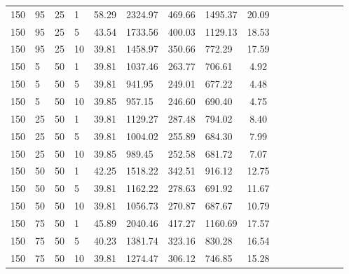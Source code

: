 \begin{center}
\begin{table}[h]
\begin{tabular}{clclclclclclclc|c}
150 & 95 & 25 & 1 & \cellcolor{gray!1}58.29 & \cellcolor{gray!1}2324.97 & \cellcolor{gray!1}469.66 & \cellcolor{gray!1}1495.37 & 20.09\\
150 & 95 & 25 & 5 & \cellcolor{gray!13}43.54 & \cellcolor{gray!1}1733.56 & \cellcolor{gray!1}400.03 & \cellcolor{gray!1}1129.13 & 18.53\\
150 & 95 & 25 & 10 & \cellcolor{gray!50}39.81 & \cellcolor{gray!1}1458.97 & \cellcolor{gray!1}350.66 & \cellcolor{gray!21}772.29 & 17.59\\
150 & 5 & 50 & 1 & \cellcolor{gray!50}39.81 & \cellcolor{gray!30}1037.46 & \cellcolor{gray!19}263.77 & \cellcolor{gray!41}706.61 & 4.92\\
150 & 5 & 50 & 5 & \cellcolor{gray!50}39.81 & \cellcolor{gray!48}941.95 & \cellcolor{gray!36}249.01 & \cellcolor{gray!50}677.22 & 4.48\\
150 & 5 & 50 & 10 & \cellcolor{gray!50}39.85 & \cellcolor{gray!45}957.15 & \cellcolor{gray!39}246.60 & \cellcolor{gray!46}690.40 & 4.75\\
150 & 25 & 50 & 1 & \cellcolor{gray!50}39.81 & \cellcolor{gray!13}1129.27 & \cellcolor{gray!1}287.48 & \cellcolor{gray!14}794.02 & 8.40\\
150 & 25 & 50 & 5 & \cellcolor{gray!50}39.81 & \cellcolor{gray!37}1004.02 & \cellcolor{gray!28}255.89 & \cellcolor{gray!48}684.30 & 7.99\\
150 & 25 & 50 & 10 & \cellcolor{gray!50}39.85 & \cellcolor{gray!39}989.45 & \cellcolor{gray!32}252.58 & \cellcolor{gray!49}681.72 & 7.07\\
150 & 50 & 50 & 1 & \cellcolor{gray!26}42.25 & \cellcolor{gray!1}1518.22 & \cellcolor{gray!1}342.51 & \cellcolor{gray!1}916.12 & 12.75\\
150 & 50 & 50 & 5 & \cellcolor{gray!50}39.81 & \cellcolor{gray!7}1162.22 & \cellcolor{gray!2}278.63 & \cellcolor{gray!46}691.92 & 11.67\\
150 & 50 & 50 & 10 & \cellcolor{gray!50}39.81 & \cellcolor{gray!27}1056.73 & \cellcolor{gray!11}270.87 & \cellcolor{gray!47}687.67 & 10.79\\
150 & 75 & 50 & 1 & \cellcolor{gray!1}45.89 & \cellcolor{gray!1}2040.46 & \cellcolor{gray!1}417.27 & \cellcolor{gray!1}1160.69 & 17.57\\
150 & 75 & 50 & 5 & \cellcolor{gray!46}40.23 & \cellcolor{gray!1}1381.74 & \cellcolor{gray!1}323.16 & \cellcolor{gray!3}830.28 & 16.54\\
150 & 75 & 50 & 10 & \cellcolor{gray!50}39.81 & \cellcolor{gray!1}1274.47 & \cellcolor{gray!1}306.12 & \cellcolor{gray!29}746.85 & 15.28\\

\end{tabular}
\end{table}
\end{center}
